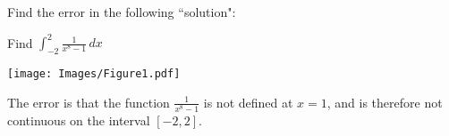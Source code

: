 \documentclass[handout, nooutcomes]{ximera}
\renewenvironment{freeResponse}{
\ifhandout\setbox0\vbox\bgroup\else
\begin{trivlist}\item[\hskip \labelsep\bfseries Solution:\hspace{2ex}]
\fi}
{\ifhandout\egroup\else
\end{trivlist}
\fi}
\renewcommand{\d}{\,d}
\begin{document}
\begin{problem}
Find the error in the following ``solution":

Find $\int_{-2}^2 \frac{1}{x^8 - 1} \d x$

	\begin{image}
	\texttt{[image: Images/Figure1.pdf]}
	\end{image}

	\begin{freeResponse}
	The error is that the function $\frac{1}{x^8-1}$ is not defined at $x=1$, and is therefore not continuous on the interval $[-2,2]$.
	\end{freeResponse}
\end{problem}
\end{document}
